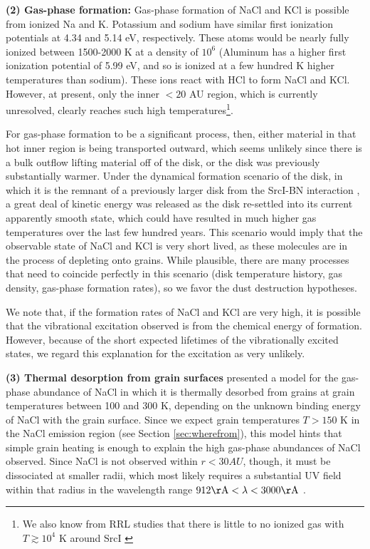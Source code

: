 \documentclass[twocolumn]{aastex62}
\newcommand{\sourcei}{SrcI\xspace}
\begin{document}
\textbf{(2) Gas-phase formation:}
Gas-phase formation of NaCl and KCl is possible from ionized Na and K.
Potassium and sodium have similar first ionization potentials at 4.34 and 5.14
eV, respectively.  These atoms would be nearly fully ionized between 1500-2000
K at a density of $10^6$ \percc (Aluminum has a higher first ionization
potential of 5.99 eV, and so is ionized at a few hundred K higher temperatures
than sodium).  These ions react with HCl to form NaCl and KCl.  However, at
present, only the inner $<20$ AU region, which is currently unresolved, clearly
reaches such high temperatures\footnote{We also know from RRL studies that
there is little to no ionized gas with $T\gtrsim10^4$ K around \sourcei
\citep{Plambeck2016a,Baez-Rubio2018a}}.  

For gas-phase formation to be a significant process, then, either material in
that hot inner region is being transported outward, which seems unlikely since
there is a bulk outflow lifting material off of the disk, or the disk was
previously substantially warmer.  Under the dynamical formation scenario of the
disk, in which it is the remnant of a previously larger disk from the
\sourcei-BN interaction \citep{Bally2017a,Luhman2017a}, a great deal of kinetic
energy was released as the disk re-settled into its current apparently smooth
state, which could have resulted in much higher gas temperatures over the last
few hundred years.  This scenario would imply that the observable state of NaCl
and KCl is very short lived, as these molecules are in the process of depleting
onto grains.  While plausible, there are many processes that need to coincide
perfectly in this scenario (disk temperature history, gas density, gas-phase
formation rates), so we favor the dust destruction hypotheses.

We note that, if the formation rates of NaCl and KCl are very high, it is
possible that the vibrational excitation observed is from the chemical energy
of formation.  However, because of the short expected lifetimes of the
vibrationally excited states, we regard this explanation for the excitation as
very unlikely.


\textbf{(3) Thermal desorption from grain surfaces}
\citet{Decin2016a} presented a model for the gas-phase abundance of
NaCl in which it is thermally desorbed from grains at grain temperatures
between 100 and 300 K, depending on the unknown binding energy of NaCl with
the grain surface.  Since we expect grain temperatures $T>150$ K in the
NaCl emission region (see Section \ref{sec:wherefrom}), this model hints
that simple grain heating is enough to explain the high gas-phase abundances
of NaCl observed.  Since NaCl is not observed within $r<30 AU$, though,
it must be dissociated at smaller radii, which most likely requires
a substantial UV field within that radius in the wavelength range
$912 \mathrm{\AA} < \lambda < 3000 \mathrm{\AA}$ \citep{Silver1986a}.
\end{document}
